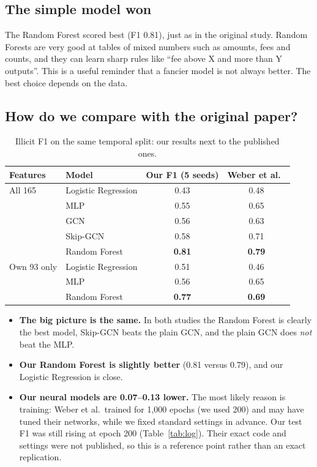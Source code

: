 \documentclass[11pt,a4paper]{article}
\begin{document}
\subsection{The simple model won}
The Random Forest scored best (F1 0.81), just as in the original study. Random Forests are very good at tables of mixed
numbers such as amounts, fees and counts, and they can learn sharp rules like ``fee above X and more than Y outputs''. This is a
useful reminder that a fancier model is not always better. The best choice depends on the data.

\subsection{How do we compare with the original paper?}
\label{sec:published}
\begin{table}[H]
\centering\small
\begin{tabular}{llcc}
\toprule
Features & Model & Our F1 (5 seeds) & Weber et al.\ \cite{weber} \\
\midrule
All 165 & Logistic Regression & 0.43 & 0.48 \\
        & MLP                 & 0.55 & 0.65 \\
        & GCN                 & 0.56 & 0.63 \\
        & Skip-GCN            & 0.58 & 0.71 \\
        & Random Forest       & \textbf{0.81} & \textbf{0.79} \\
\midrule
Own 93 only & Logistic Regression & 0.51 & 0.46 \\
        & MLP                 & 0.56 & 0.65 \\
        & Random Forest       & \textbf{0.77} & \textbf{0.69} \\
\bottomrule
\end{tabular}
\caption{Illicit F1 on the same temporal split: our results next to the published ones.}
\label{tab:published}
\end{table}
\begin{itemize}
  \item \textbf{The big picture is the same.} In both studies the Random Forest is clearly the best model, Skip-GCN beats the
        plain GCN, and the plain GCN does \emph{not} beat the MLP.
  \item \textbf{Our Random Forest is slightly better} (0.81 versus 0.79), and our Logistic Regression is close.
  \item \textbf{Our neural models are 0.07--0.13 lower.} The most likely reason is training: Weber et al.\ trained for
        1,000 epochs (we used 200) and may have tuned their networks, while we fixed standard settings in advance. Our test
        F1 was still rising at epoch 200 (Table~\ref{tab:log}). Their exact code and settings were not published, so this is a
        reference point rather than an exact replication.
\end{itemize}
\end{document}

